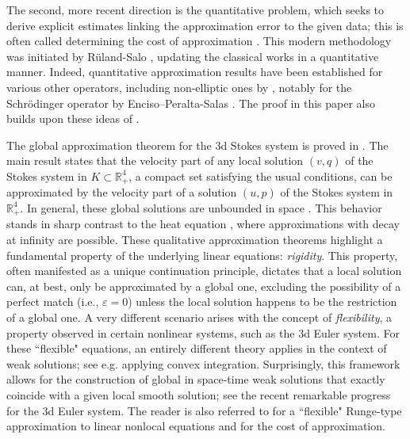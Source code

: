 \documentclass[11pt,a4paper]{article}
\numberwithin{equation}{section}
\newcommand{\R}{\mathbb{R}}
\newcommand{\eps}{\varepsilon}
\begin{document}
The second, more recent direction is the quantitative problem, which seeks to derive explicit estimates linking the approximation error to the given data; this is often called determining the cost of approximation \cite{DebKal2025}. This modern methodology was initiated by R\"{u}land-Salo \cite{RulSal2019}, updating the classical works \cite{Lax1956,Mal1955} in a quantitative manner. Indeed, quantitative approximation results have been established for various other operators, including non-elliptic ones by \cite{RulSal2020a,RulSal2020b,DebKal2025}, notably for the Schr\"{o}dinger operator by Enciso--Peralta-Salas \cite{EncPer2021}. The proof in this paper also builds upon these ideas of \cite{RulSal2019}.


The global approximation theorem for the 3d Stokes system is proved in \cite{HigSue2025}. The main result \cite[Theorem A]{HigSue2025} states that the velocity part of any local solution $(v,q)$ of the Stokes system in $K \subset \R^{4}_{+}$, a compact set satisfying the usual conditions, can be approximated by the velocity part of a solution $(u,p)$ of the Stokes system in $\R^{4}_{+}$. In general, these global solutions are unbounded in space \cite[Theorem B]{HigSue2025}. This behavior stands in sharp contrast to the heat equation \cite[Theorem 1.2]{EGFPS2019}, where approximations with decay at infinity are possible. These qualitative approximation theorems highlight a fundamental property of the underlying linear equations: \emph{rigidity}. This property, often manifested as a unique continuation principle, dictates that a local solution can, at best, only be approximated by a global one, excluding the possibility of a perfect match (i.e., $\eps=0$) unless the local solution happens to be the restriction of a global one. A very different scenario arises with the concept of \emph{flexibility}, a property observed in certain nonlinear systems, such as the 3d Euler system. For these ``flexible" equations, an entirely different theory applies in the context of weak solutions; see e.g. \cite{DeLelSze2009,LewPak2017} applying convex integration. Surprisingly, this framework allows for the construction of global in space-time weak solutions that exactly coincide with a given local smooth solution; see the recent remarkable progress \cite{EPTPS2025} for the 3d Euler system. The reader is also referred to \cite{DSV2019} for a ``flexible" Runge-type approximation to linear nonlocal equations and \cite{RulSal2020b} for the cost of approximation.
\end{document}
